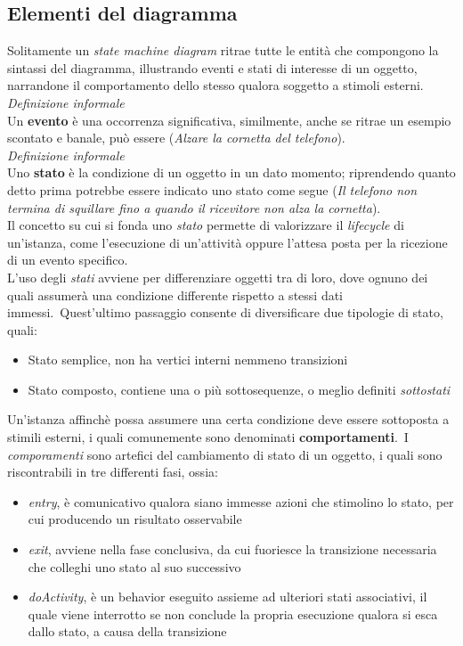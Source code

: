 \documentclass{article}
\begin{document}
\subsection*{Elementi del diagramma}
\large
Solitamente un \textit{state machine diagram} ritrae tutte le entità che compongono la sintassi del diagramma, illustrando eventi e stati di interesse di un oggetto, narrandone il comportamento dello stesso qualora soggetto a stimoli esterni.\vspace*{14pt}\\
\textit{Definizione informale}\\Un \textbf{evento} è una occorrenza significativa, similmente, anche se ritrae un esempio scontato e banale, può essere (\textit{Alzare la cornetta del telefono}).\vspace*{14pt}\\
\textit{Definizione informale}\\Uno \textbf{stato} è la condizione di un oggetto in un dato momento; riprendendo quanto detto prima potrebbe essere indicato uno stato come segue (\textit{Il telefono non termina di squillare fino a quando il ricevitore non alza la cornetta}).\vspace*{14pt}\\
Il concetto su cui si fonda uno \textit{stato} permette di valorizzare il \textit{lifecycle} di un'istanza, come l'esecuzione di un'attività oppure l'attesa posta per la ricezione di un evento specifico.\\
L'uso degli \textit{stati} avviene per differenziare oggetti tra di loro, dove ognuno dei quali assumerà una condizione differente rispetto a stessi dati immessi.\ Quest'ultimo passaggio consente di diversificare due tipologie di stato, quali:
\begin{itemize}[label={-}]
    \itemsep0em
    \item Stato semplice, non ha vertici interni nemmeno transizioni
    \item Stato composto, contiene una o più sottosequenze, o meglio definiti \textit{sottostati}
\end{itemize}
Un'istanza affinchè possa assumere una certa condizione deve essere sottoposta a stimili esterni, i quali comunemente sono denominati \textbf{comportamenti}.\ I \textit{comporamenti} sono artefici del cambiamento di stato di un oggetto, i quali sono riscontrabili in tre differenti fasi, ossia:
\begin{itemize}[label={-}]
    \itemsep0em
    \item \textit{entry}, è comunicativo qualora siano immesse azioni che stimolino lo stato, per cui producendo un risultato osservabile
    \item \textit{exit}, avviene nella fase conclusiva, da cui fuoriesce la transizione necessaria che colleghi uno stato al suo successivo
    \item \textit{doActivity}, è un behavior eseguito assieme ad ulteriori stati associativi, il quale viene interrotto se non conclude la propria esecuzione qualora si esca dallo stato, a causa della transizione 
\end{itemize}
\end{document}
